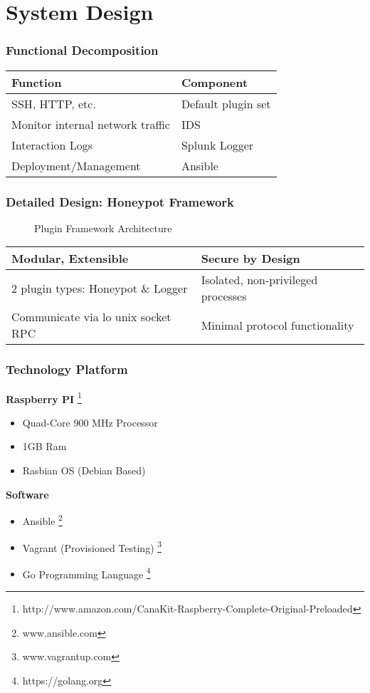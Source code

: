 \section{System Design}

\begin{frame}
\frametitle{Functional Decomposition}
\centering

\begin{tabular}{l | l}
\toprule
\textbf{Function} & \textbf{Component} \\
\midrule
SSH, HTTP, etc. & Default plugin set \\
Monitor internal network traffic & IDS \\
Interaction Logs & Splunk Logger \\
Deployment/Management & Ansible\\

\bottomrule
\end{tabular}

\end{frame}

\begin{frame}
\frametitle{Detailed Design: Honeypot Framework}

\begin{figure}
\centering
\caption{Plugin Framework Architecture}
{
\scalebox{0.7}{}
}
\end{figure}

\begin{table}
\centering
\small
\begin{tabularx}{\linewidth}{l l}
\textbf{Modular, Extensible} & \textbf{Secure by Design} \\
\midrule
2 plugin types: Honeypot \& Logger & Isolated, non-privileged processes \\
Communicate via lo unix socket RPC & Minimal protocol functionality \\
\end{tabularx}
\end{table}
\end{frame}

\begin{frame}
\frametitle{Technology Platform}
\textbf{Raspberry PI} \footnote{http://www.amazon.com/CanaKit-Raspberry-Complete-Original-Preloaded}
\begin{itemize}
\item Quad-Core 900 MHz Processor
\item 1GB Ram
\item Rasbian OS (Debian Based) 
\end{itemize}

\textbf{Software}
\begin{itemize}
\item Ansible \footnote{www.ansible.com}
\item Vagrant (Provisioned Testing) \footnote{www.vagrantup.com}
\item Go Programming Language \footnote{https://golang.org}
\end{itemize}


\end{frame}

